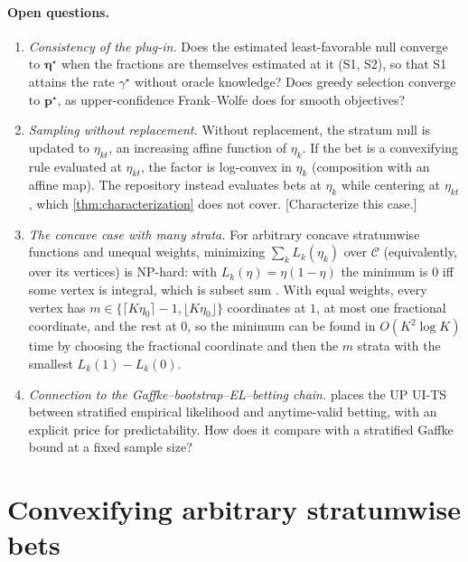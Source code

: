 \documentclass[11pt]{article}
\newcommand{\bs}{\boldsymbol}
\newcommand{\calC}{\mathcal{C}}
\newcommand{\todo}[1]{{\color{red!70!black}\textsf{[#1]}}}
\theoremstyle{plain}
\theoremstyle{definition}
\theoremstyle{remark}
\begin{document}
\paragraph{Open questions.}
\begin{enumerate}
  \item \emph{Consistency of the plug-in.}  Does the estimated least-favorable null converge to $\bs\eta^\star$ when the
  fractions are themselves estimated at it (S1, S2), so that S1 attains the rate $\gamma^\star$ without oracle knowledge?
  Does greedy selection converge to $\bs p^\star$, as upper-confidence Frank--Wolfe does for smooth objectives?
  \item \emph{Sampling without replacement.}  Without replacement, the stratum null is updated to $\eta_{kt}$, an
  increasing affine function of $\eta_k$.  If the bet is a convexifying rule evaluated at $\eta_{kt}$, the factor is
  log-convex in $\eta_k$ (composition with an affine map).  The repository instead evaluates bets at $\eta_k$ while
  centering at $\eta_{kt}$, which \cref{thm:characterization} does not cover.  \todo{Characterize this case.}
  \item \emph{The concave case with many strata.}  For arbitrary concave stratumwise functions and unequal weights,
  minimizing $\sum_kL_k(\eta_k)$ over $\calC$ (equivalently, over its vertices) is NP-hard: with $L_k(\eta)=\eta(1-\eta)$
  the minimum is $0$ iff some vertex is integral, which is subset sum \citep{garey1979computers}.  With equal weights,
  every vertex has $m\in\{\lceil K\eta_0\rceil-1,\lfloor K\eta_0\rfloor\}$ coordinates at $1$, at most one fractional
  coordinate, and the rest at $0$, so the minimum can be found in $O(K^2\log K)$ time by choosing the fractional
  coordinate and then the $m$ strata with the smallest $L_k(1)-L_k(0)$.
  \item \emph{Connection to the Gaffke--bootstrap--EL--betting chain.}   places the UP UI-TS between
  stratified empirical likelihood and anytime-valid betting, with an explicit price for predictability.  How does it
  compare with a stratified Gaffke bound at a fixed sample size?
\end{enumerate}




\appendix
\section{Convexifying arbitrary stratumwise bets}\label{app:convexify}
\end{document}
